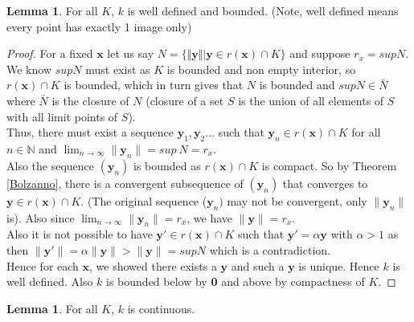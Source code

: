 \documentclass{article}
\theoremstyle{definition}
\newtheorem{lem}[theorem]{Lemma}
\begin{document}
\begin{lem}
For all $K$, $k$ is well defined and bounded. (Note, well defined means every point has exactly 1 image only)
\end{lem} 
\begin{proof}
For a fixed $\mathbf{x}$ let us say $N = \{ \Vert \mathbf{y} \Vert \vert \mathbf{y} \in r(\mathbf{x})\cap K\}$ and suppose $r_x = sup N$. We know $sup N$ must exist as $K$ is bounded and non empty interior, so $r(\mathbf{x})\cap K$ is bounded, which in turn gives that $N$ is bounded and $sup N \in \bar{N}$ where $\bar{N}$ is the closure of $N$ (closure of a set $S$ is the union of all elements of $S$ with all limit points of $S$).\\

Thus, there must exist a sequence $\mathbf{y}_1,\mathbf{y}_2 \dots$ such that $\mathbf{y}_n \in r(\mathbf{x}) \cap K$ for all $n\in\mathbb{N}$ and $\lim_{n\to\infty} \| \mathbf{y}_n\| = sup~N = r_x$. \\
Also the sequence $(\mathbf{y}_n)$ is bounded as $r(\mathbf{x}) \cap K$ is compact. So by Theorem \ref{Bolzanno}, there is a convergent subsequence of $(\mathbf{y}_n)$ that converges to $\mathbf{y}\in r(\mathbf{x}) \cap K$. (The original sequence ($\mathbf{y}_n)$ may not be convergent, only $\| \mathbf{y}_n\|$ is). Also since $\lim_{n\to\infty} \| \mathbf{y}_n\| = r_x$, we have $\| \mathbf{y}\| = r_x$.\\
Also it is not possible to have $\mathbf{y}' \in r(\mathbf{x}) \cap K$ such that $\mathbf{y}' = \alpha \mathbf{y}$ with $\alpha>1$ as then $\|\mathbf{y}'\| = \alpha\| \mathbf{y}\| > \|\mathbf{y}\| = sup N$ which is a contradiction.\\
Hence for each $\mathbf{x}$, we showed there exists a $\mathbf{y}$ and such a $\mathbf{y}$ is unique. Hence $k$ is well defined. Also $k$ is bounded below by \textbf{0} and above by compactness of $K$.
\end{proof}
\begin{lem}
For all $K$, $k$ is continuous.
\end{lem}
\end{document}
